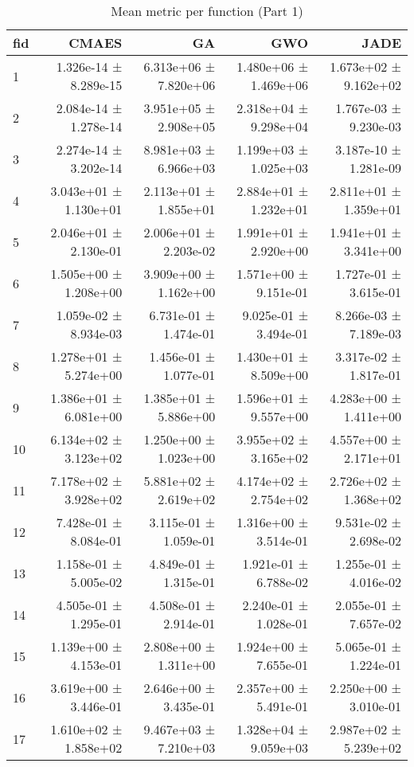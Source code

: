 \begin{table}[htbp]
    \centering
    \caption{Mean metric per function (Part 1)}
    \label{tab:mean_all_part1}
    \begin{tabular}{lrrrr}
    \toprule
    fid & CMAES & GA & GWO & JADE \\
    \midrule
    1 & 1.326e-14 ± 8.289e-15 & 6.313e+06 ± 7.820e+06 & 1.480e+06 ± 1.469e+06 & 1.673e+02 ± 9.162e+02 \\
2 & 2.084e-14 ± 1.278e-14 & 3.951e+05 ± 2.908e+05 & 2.318e+04 ± 9.298e+04 & 1.767e-03 ± 9.230e-03 \\
3 & 2.274e-14 ± 3.202e-14 & 8.981e+03 ± 6.966e+03 & 1.199e+03 ± 1.025e+03 & 3.187e-10 ± 1.281e-09 \\
4 & 3.043e+01 ± 1.130e+01 & 2.113e+01 ± 1.855e+01 & 2.884e+01 ± 1.232e+01 & 2.811e+01 ± 1.359e+01 \\
5 & 2.046e+01 ± 2.130e-01 & 2.006e+01 ± 2.203e-02 & 1.991e+01 ± 2.920e+00 & 1.941e+01 ± 3.341e+00 \\
6 & 1.505e+00 ± 1.208e+00 & 3.909e+00 ± 1.162e+00 & 1.571e+00 ± 9.151e-01 & 1.727e-01 ± 3.615e-01 \\
7 & 1.059e-02 ± 8.934e-03 & 6.731e-01 ± 1.474e-01 & 9.025e-01 ± 3.494e-01 & 8.266e-03 ± 7.189e-03 \\
8 & 1.278e+01 ± 5.274e+00 & 1.456e-01 ± 1.077e-01 & 1.430e+01 ± 8.509e+00 & 3.317e-02 ± 1.817e-01 \\
9 & 1.386e+01 ± 6.081e+00 & 1.385e+01 ± 5.886e+00 & 1.596e+01 ± 9.557e+00 & 4.283e+00 ± 1.411e+00 \\
10 & 6.134e+02 ± 3.123e+02 & 1.250e+00 ± 1.023e+00 & 3.955e+02 ± 3.165e+02 & 4.557e+00 ± 2.171e+01 \\
11 & 7.178e+02 ± 3.928e+02 & 5.881e+02 ± 2.619e+02 & 4.174e+02 ± 2.754e+02 & 2.726e+02 ± 1.368e+02 \\
12 & 7.428e-01 ± 8.084e-01 & 3.115e-01 ± 1.059e-01 & 1.316e+00 ± 3.514e-01 & 9.531e-02 ± 2.698e-02 \\
13 & 1.158e-01 ± 5.005e-02 & 4.849e-01 ± 1.315e-01 & 1.921e-01 ± 6.788e-02 & 1.255e-01 ± 4.016e-02 \\
14 & 4.505e-01 ± 1.295e-01 & 4.508e-01 ± 2.914e-01 & 2.240e-01 ± 1.028e-01 & 2.055e-01 ± 7.657e-02 \\
15 & 1.139e+00 ± 4.153e-01 & 2.808e+00 ± 1.311e+00 & 1.924e+00 ± 7.655e-01 & 5.065e-01 ± 1.224e-01 \\
16 & 3.619e+00 ± 3.446e-01 & 2.646e+00 ± 3.435e-01 & 2.357e+00 ± 5.491e-01 & 2.250e+00 ± 3.010e-01 \\
17 & 1.610e+02 ± 1.858e+02 & 9.467e+03 ± 7.210e+03 & 1.328e+04 ± 9.059e+03 & 2.987e+02 ± 5.239e+02 \\

\end{tabular}
\end{table}
